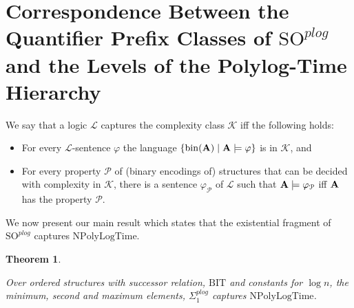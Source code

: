 \documentclass{article}
\newtheorem{theorem}{Theorem}
\newcommand{\npolylog}{\mathrm{NPolyLogTime}}
\begin{document}
\section{Correspondence Between the Quantifier Prefix Classes of \texorpdfstring{$\mathrm{SO}^{\mathit{plog}}$}{TEXT} and the Levels of the Polylog-Time Hierarchy} \label{sec:main}

We say that a logic $\mathcal{L}$ captures the complexity class $\mathcal{K}$ iff the following holds:
\begin{itemize} 

\item For every $\mathcal{L}$-sentence $\varphi$ the language $\{\mathrm{bin}({\bf A}) \mid {\bf A} \models \varphi \}$ is in $\mathcal{K}$, and

\item For every property $\mathcal{P}$ of (binary encodings of) structures that can be decided with complexity in $\mathcal{K}$, there is a sentence $\varphi_{\mathcal{P}}$ of $\mathcal{L}$ such that ${\bf A} \models \varphi_{\mathcal{P}}$ iff $\bf A$ has the property $\mathcal{P}$. 

\end{itemize} 

We now present our main result which states that the existential fragment of $\mathrm{SO}^{\mathit{plog}}$ captures $\npolylog$.

\begin{theorem}\label{pedsoplog}

Over ordered structures with successor relation, $\mathrm{BIT}$ and constants for $\log n$, the minimum, second and maximum elements, $\Sigma^{\mathit{plog}}_1$ captures $\npolylog$.

\end{theorem}
\end{document}
